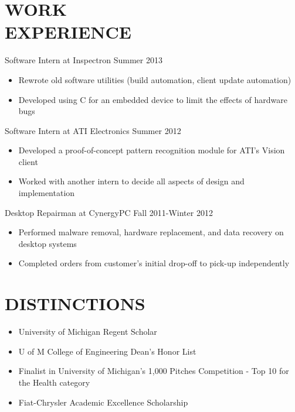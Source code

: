 \documentclass[line,margin]{res}
\begin{document}
\begin{resume}
\section{WORK \\ EXPERIENCE} {\sc Software Intern at Inspectron} \hfill Summer 2013 \\
                 \begin{itemize}  \itemsep -2pt %
                 \item Rewrote old software utilities (build automation, client update automation)
                \item   Developed using C for an embedded device to limit the effects of hardware bugs
                \end{itemize}
 
                {\sc Software Intern at ATI Electronics} \hfill            Summer 2012 \\
                 \begin{itemize}  \itemsep -2pt %
                 \item Developed a proof-of-concept pattern recognition module for ATI’s Vision client
                 \item Worked with another intern to decide all aspects of design and implementation
                 \end{itemize} 
                {\sc Desktop Repairman at CynergyPC} \hfill        Fall 2011-Winter 2012 \\
                  \begin{itemize}
                   \item Performed malware removal, hardware replacement, and data recovery on desktop systems
                   \item Completed orders from customer’s initial drop-off to pick-up independently 
                   \end{itemize} 

\section{DISTINCTIONS}
    \begin{itemize}
    \item University of Michigan Regent Scholar
    \item U of M College of Engineering Dean’s Honor List
    \item Finalist in University of Michigan’s 1,000 Pitches Competition - Top 10 for the Health category
    \item Fiat-Chrysler Academic Excellence Scholarship
    \end{itemize}
 

 

\end{resume}
\end{document}
